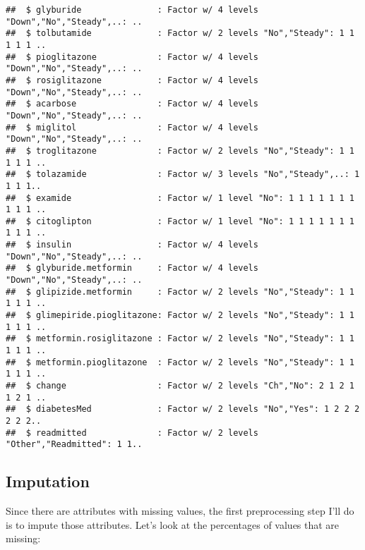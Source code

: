 \documentclass{article}\usepackage[]{graphicx}\usepackage[]{color}
\makeatletter
\newenvironment{kframe}{%
 \def\at@end@of@kframe{}%
 \ifinner\ifhmode%
  \def\at@end@of@kframe{\end{minipage}}%
  \begin{minipage}{\columnwidth}%
 \fi\fi%
 \def\FrameCommand##1{\hskip\@totalleftmargin \hskip-\fboxsep
 \colorbox{shadecolor}{##1}\hskip-\fboxsep
     \hskip-\linewidth \hskip-\@totalleftmargin \hskip\columnwidth}%
 \MakeFramed {\advance\hsize-\width
   \@totalleftmargin\z@ \linewidth\hsize
   \@setminipage}}%
 {\par\unskip\endMakeFramed%
 \at@end@of@kframe}
\newenvironment{knitrout}{}{} %
\makeatother
\begin{document}
\begin{knitrout}
\begin{kframe}
\begin{verbatim}
##  $ glyburide               : Factor w/ 4 levels "Down","No","Steady",..: ..
##  $ tolbutamide             : Factor w/ 2 levels "No","Steady": 1 1 1 1 1 ..
##  $ pioglitazone            : Factor w/ 4 levels "Down","No","Steady",..: ..
##  $ rosiglitazone           : Factor w/ 4 levels "Down","No","Steady",..: ..
##  $ acarbose                : Factor w/ 4 levels "Down","No","Steady",..: ..
##  $ miglitol                : Factor w/ 4 levels "Down","No","Steady",..: ..
##  $ troglitazone            : Factor w/ 2 levels "No","Steady": 1 1 1 1 1 ..
##  $ tolazamide              : Factor w/ 3 levels "No","Steady",..: 1 1 1 1..
##  $ examide                 : Factor w/ 1 level "No": 1 1 1 1 1 1 1 1 1 1 ..
##  $ citoglipton             : Factor w/ 1 level "No": 1 1 1 1 1 1 1 1 1 1 ..
##  $ insulin                 : Factor w/ 4 levels "Down","No","Steady",..: ..
##  $ glyburide.metformin     : Factor w/ 4 levels "Down","No","Steady",..: ..
##  $ glipizide.metformin     : Factor w/ 2 levels "No","Steady": 1 1 1 1 1 ..
##  $ glimepiride.pioglitazone: Factor w/ 2 levels "No","Steady": 1 1 1 1 1 ..
##  $ metformin.rosiglitazone : Factor w/ 2 levels "No","Steady": 1 1 1 1 1 ..
##  $ metformin.pioglitazone  : Factor w/ 2 levels "No","Steady": 1 1 1 1 1 ..
##  $ change                  : Factor w/ 2 levels "Ch","No": 2 1 2 1 1 2 1 ..
##  $ diabetesMed             : Factor w/ 2 levels "No","Yes": 1 2 2 2 2 2 2..
##  $ readmitted              : Factor w/ 2 levels "Other","Readmitted": 1 1..
\end{verbatim}
\end{kframe}
\end{knitrout}

\subsection{Imputation}

Since there are attributes with missing values, the first preprocessing step
I'll do is to impute those attributes.  Let's look at the percentages of values
that are missing:
\end{document}
